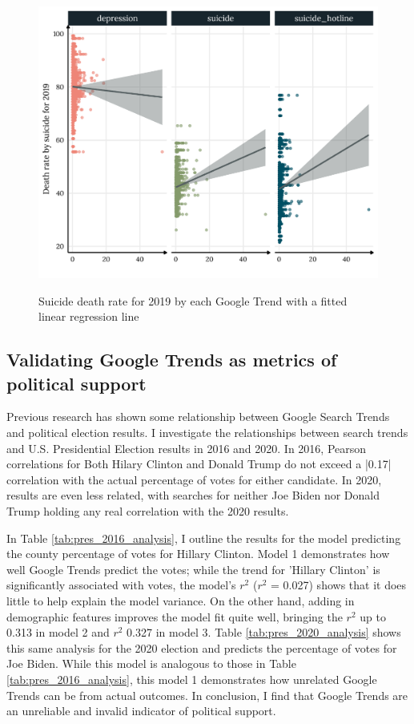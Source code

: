 
\begin{figure}[h]
{\centering \includegraphics[width=0.8\linewidth]{figs/paper1/suicide_plot-1.pdf}}
\caption{Suicide death rate for 2019 by each Google Trend with a fitted linear regression line}\label{fig:suicide_plot-1}
\end{figure}

\subsection{Validating Google Trends as metrics of political support}

Previous research has shown some relationship between Google Search Trends and
political election results. I investigate the relationships between search trends
and U.S. Presidential Election results in 2016 and 2020. In 2016, Pearson
correlations for Both Hilary Clinton and Donald Trump do not exceed a |0.17|
correlation with the actual percentage of votes for either candidate. In 2020,
results are even less related, with searches for neither Joe Biden nor Donald
Trump holding any real correlation with the 2020 results.

In Table \ref{tab:pres_2016_analysis}, I outline the results for the model
predicting the county percentage of votes for Hillary Clinton. Model 1
demonstrates how well Google Trends predict the votes; while the trend for
'Hillary Clinton' is significantly associated with votes, the model's $r^2$
($r^2$ = 0.027) shows that it does little to help explain the model variance. On
the other hand, adding in demographic features improves the model fit quite
well, bringing the $r^2$ up to 0.313 in model 2 and $r^2$ 0.327 in model 3.
Table \ref{tab:pres_2020_analysis} shows this same analysis for the 2020
election and predicts the percentage of votes for Joe Biden. While this model is
analogous to those in Table \ref{tab:pres_2016_analysis}, this model 1
demonstrates how unrelated Google Trends can be from actual outcomes. In
conclusion, I find that Google Trends are an unreliable and invalid indicator of
political support.


